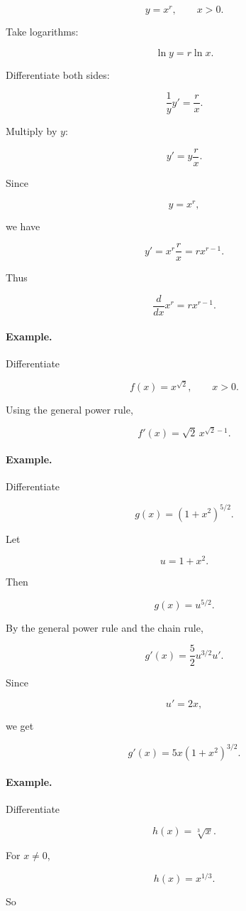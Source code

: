 \[
y=x^r,
\qquad x>0.
\]

Take logarithms:

\[
\ln y=r\ln x.
\]

Differentiate both sides:

\[
\frac1y y'=\frac r x.
\]

Multiply by \(y\):

\[
y'=y\frac r x.
\]

Since

\[
y=x^r,
\]

we have

\[
y'=x^r\frac r x=rx^{r-1}.
\]

Thus

\[
\boxed{
\frac{d}{dx}x^r=rx^{r-1}.
}
\]

\paragraph{Example.}
Differentiate

\[
f(x)=x^{\sqrt2},
\qquad x>0.
\]

Using the general power rule,

\[
\boxed{
f'(x)=\sqrt2\,x^{\sqrt2-1}.
}
\]

\paragraph{Example.}
Differentiate

\[
g(x)=(1+x^2)^{5/2}.
\]

Let

\[
u=1+x^2.
\]

Then

\[
g(x)=u^{5/2}.
\]

By the general power rule and the chain rule,

\[
g'(x)=\frac52 u^{3/2}u'.
\]

Since

\[
u'=2x,
\]

we get

\[
\boxed{
g'(x)=5x(1+x^2)^{3/2}.
}
\]

\paragraph{Example.}
Differentiate

\[
h(x)=\sqrt[3]{x}.
\]

For \(x\neq0\),

\[
h(x)=x^{1/3}.
\]

So

